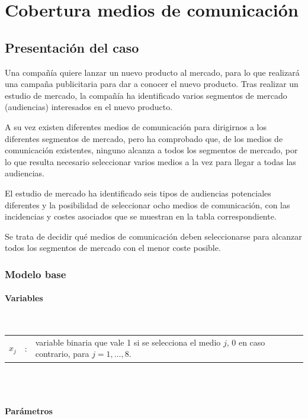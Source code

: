 \section{Cobertura medios de comunicación}


\subsection{Presentación del caso}

Una compañía quiere lanzar un nuevo producto al mercado, para lo que realizará una campaña publicitaria para dar a conocer el nuevo producto. Tras realizar un estudio de mercado, la compañía ha identificado varios segmentos de mercado (audiencias) interesados en el nuevo producto. 

A su vez existen diferentes medios de comunicación para dirigirnos a los diferentes segmentos de mercado, pero ha comprobado que, de los medios de comunicación existentes, ninguno alcanza a todos los segmentos de mercado, por lo que resulta necesario seleccionar varios medios a la vez para llegar a todas las audiencias. 

El estudio de mercado ha identificado seis tipos de audiencias potenciales diferentes y la posibilidad de seleccionar ocho medios de comunicación, con las incidencias y costes asociados que se muestran en la tabla correspondiente.  

Se trata de decidir qué medios de comunicación deben seleccionarse para alcanzar todos los segmentos de mercado con el menor coste posible.

\subsubsection{Modelo base}

\paragraph{Variables}\mbox{}\\

\begin{tabular}{l c l}
$x_j$ & : & variable binaria que vale 1 si se selecciona el medio $j$, 0 en caso contrario, para $j = 1, \dots, 8$. \\
\end{tabular}
\\
\\

\paragraph{Parámetros}\mbox{}\\

